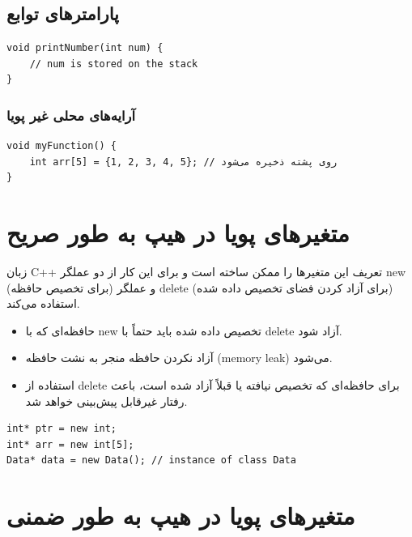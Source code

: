 \documentclass{article}
\begin{document}
\subsection*{پارامتر‌های توابع}


\begin{LTR} %
\begin{lstlisting}
void printNumber(int num) {
    // num is stored on the stack
}
\end{lstlisting}
\end{LTR}

\subsubsection*{آرایه‌‌های محلی غیر پویا}
\begin{LTR} %
\begin{lstlisting}
void myFunction() {
    int arr[5] = {1, 2, 3, 4, 5}; // روی پشته ذخیره می‌شود
}
\end{lstlisting}
\end{LTR}


\section*{متغیرهای پویا در هیپ به طور صریح}

زبان C++ تعریف این متغیرها را ممکن ساخته است و برای این کار از دو عملگر new (برای تخصیص حافظه) و عملگر delete (برای آزاد کردن فضای تخصیص داده‌ شده) استفاده می‌کند.

\begin{itemize}
    \item حافظه‌ای که با new تخصیص داده شده باید حتماً با delete آزاد شود.
    \item آزاد نکردن حافظه منجر به نشت حافظه (memory leak) می‌شود.
    \item استفاده از delete برای حافظه‌ای که تخصیص نیافته یا قبلاً آزاد شده است، باعث رفتار غیرقابل پیش‌بینی خواهد شد.
\end{itemize}


\begin{LTR} %
\begin{lstlisting}
int* ptr = new int;
int* arr = new int[5];
Data* data = new Data(); // instance of class Data
\end{lstlisting}
\end{LTR}


\section*{متغیرهای پویا در هیپ به طور ضمنی}
\end{document}
